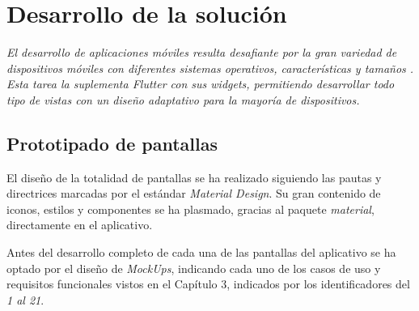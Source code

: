 \chapter{Desarrollo de la solución}
\textit{El desarrollo de aplicaciones móviles resulta desafiante por la gran variedad de dispositivos
móviles con diferentes sistemas operativos, características y tamaños \cite{7021823}. Esta tarea
la suplementa Flutter con sus widgets, permitiendo
desarrollar todo tipo de vistas con un diseño adaptativo para la mayoría de dispositivos.
}

\section{Prototipado de pantallas}
El diseño de la totalidad de pantallas se ha realizado siguiendo las pautas y directrices marcadas por
el estándar \textit{Material Design}. Su gran contenido de iconos, estilos y componentes se ha plasmado,
gracias al paquete \textit{material}, directamente en el aplicativo.

Antes del desarrollo completo de cada una de las pantallas del aplicativo se ha optado por el diseño de
\textit{MockUps}, indicando cada uno de los casos de uso y requisitos funcionales vistos en el Capítulo 
3, indicados por los identificadores del \textit{1 al 21}.

